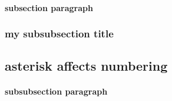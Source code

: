\paragraph*{
    subsection paragraph
}
\subsubsection*{
    my subsubsection title
}

\subsection*{
    asterisk affects numbering
}

\paragraph*{
    subsubsection paragraph
}

% 
%
%



